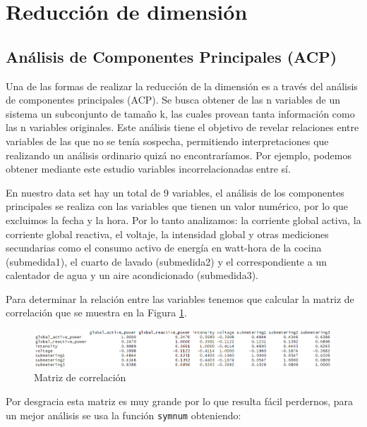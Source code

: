 \documentclass[a4paper,10pt,twocolumn]{report}
\begin{document}
	\section{Reducción de dimensión}\label{sub:acp}
	\subsection{Análisis de Componentes Principales (ACP)}

	Una de las formas de realizar la reducción de la dimensión es a través del análisis de componentes principales (ACP). Se busca obtener de las n variables de un sistema un subconjunto de tamaño k, las cuales provean tanta información como las n variables originales. Este análisis tiene el objetivo de revelar relaciones entre variables de las que no se tenía sospecha, permitiendo interpretaciones que realizando un análisis ordinario quizá no encontraríamos. Por ejemplo, podemos obtener mediante este estudio variables incorrelacionadas entre sí.
	
	En nuestro data set hay un total de 9 variables, el análisis de los componentes principales se realiza con las variables que tienen un valor numérico, por lo que excluimos la fecha y la hora. Por lo tanto analizamos: la corriente global activa, la corriente global reactiva, el voltaje, la intensidad global y otras mediciones secundarias como el consumo activo de energía en watt-hora de la cocina (submedida1), el cuarto de lavado (submedida2) y el correspondiente a un calentador de agua y un aire acondicionado (submedida3). 
	
	Para determinar la relación entre las variables tenemos que calcular la matriz de correlación que se muestra en la Figura \ref{fig:corr_matrix}.
	
	\begin{figure}[hbt]
	\centering
	\includegraphics[width=2\columnwidth]{img/acp/corr_matrix}
	\caption{Matriz de correlación}  
	\label{fig:corr_matrix}
	\end{figure}
	
	Por desgracia esta matriz es muy grande por lo que resulta fácil perdernos, para un mejor análisis se usa la función \texttt{symnum} obteniendo:
	
\end{document}
